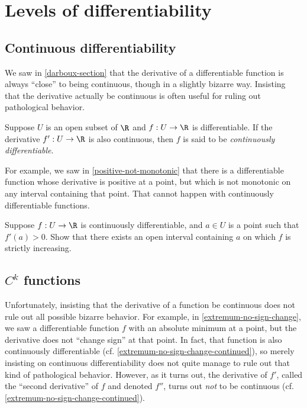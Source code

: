 \section{Levels of differentiability} 

\subsection{Continuous differentiability}

We saw in \cref{darboux-section} that the derivative of a differentiable function is always ``close'' to being continuous, though in a slightly bizarre way. Insisting that the derivative actually be continuous is often useful for ruling out pathological behavior. 

\begin{definition} \label{continuously-differentiable-singlevar}
	Suppose $U$ is an open subset of $\R$ and $f : U \to \R$ is differentiable. If the derivative $f' : U \to \R$ is also continuous, then $f$ is said to be \emph{continuously differentiable}. 
\end{definition}

For example, we saw in \cref{positive-not-monotonic} that there is a differentiable function whose derivative is positive at a point, but which is not monotonic on any interval containing that point. That cannot happen with continuously differentiable functions. 

\begin{example}
	Suppose $f : U \to \R$ is continuously differentiable, and $a \in U$ is a point such that $f'(a) > 0$. Show that there exists an open interval containing $a$ on which $f$ is strictly increasing. 
\end{example}

\subsection{\texorpdfstring{$C^k$}{Ck} functions}

Unfortunately, insisting that the derivative of a function be continuous does not rule out all possible bizarre behavior. For example, in \cref{extremum-no-sign-change}, we saw a differentiable function $f$ with an absolute minimum at a point, but the derivative does not ``change sign'' at that point. In fact, that function is also continuously differentiable (cf. \cref{extremum-no-sign-change-continued}), so merely insisting on continuous differentiability does not quite manage to rule out that kind of pathological behavior. However, as it turns out, the derivative of $f'$, called the ``second derivative'' of $f$ and denoted $f''$, turns out \emph{not} to be continuous (cf. \cref{extremum-no-sign-change-continued}). 

